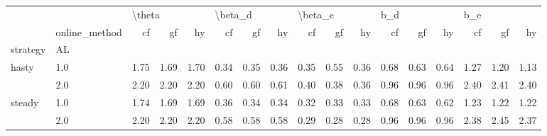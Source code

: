 \begin{tabular}{llrrrrrrrrrrrrrrr}
\toprule
       & {} & \multicolumn{3}{l}{\textbackslash theta} & \multicolumn{3}{l}{\textbackslash beta\_d} & \multicolumn{3}{l}{\textbackslash beta\_e} & \multicolumn{3}{l}{b\_d} & \multicolumn{3}{l}{b\_e} \\
       & online\_method &     cf &   gf &   hy &      cf &   gf &   hy &      cf &   gf &   hy &   cf &   gf &   hy &   cf &   gf &   hy \\
strategy & AL &        &      &      &         &      &      &         &      &      &      &      &      &      &      &      \\
\midrule
hasty & 1.0 &   1.75 & 1.69 & 1.70 &    0.34 & 0.35 & 0.36 &    0.35 & 0.55 & 0.36 & 0.68 & 0.63 & 0.64 & 1.27 & 1.20 & 1.13 \\
       & 2.0 &   2.20 & 2.20 & 2.20 &    0.60 & 0.60 & 0.61 &    0.40 & 0.38 & 0.36 & 0.96 & 0.96 & 0.96 & 2.40 & 2.41 & 2.40 \\
steady & 1.0 &   1.74 & 1.69 & 1.69 &    0.36 & 0.34 & 0.34 &    0.32 & 0.33 & 0.33 & 0.68 & 0.63 & 0.62 & 1.23 & 1.22 & 1.22 \\
       & 2.0 &   2.20 & 2.20 & 2.20 &    0.58 & 0.58 & 0.58 &    0.29 & 0.28 & 0.28 & 0.96 & 0.96 & 0.96 & 2.38 & 2.45 & 2.37 \\
\bottomrule
\end{tabular}

